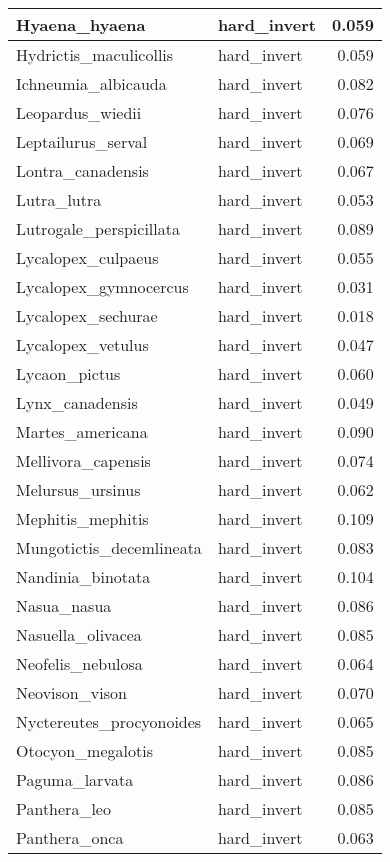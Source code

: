 \begin{table}
\begin{tabular}[t]{l|l|r}
\hline
Hyaena\_hyaena & hard\_invert & 0.059\\
\hline
Hydrictis\_maculicollis & hard\_invert & 0.059\\
\hline
Ichneumia\_albicauda & hard\_invert & 0.082\\
\hline
Leopardus\_wiedii & hard\_invert & 0.076\\
\hline
Leptailurus\_serval & hard\_invert & 0.069\\
\hline
Lontra\_canadensis & hard\_invert & 0.067\\
\hline
Lutra\_lutra & hard\_invert & 0.053\\
\hline
Lutrogale\_perspicillata & hard\_invert & 0.089\\
\hline
Lycalopex\_culpaeus & hard\_invert & 0.055\\
\hline
Lycalopex\_gymnocercus & hard\_invert & 0.031\\
\hline
Lycalopex\_sechurae & hard\_invert & 0.018\\
\hline
Lycalopex\_vetulus & hard\_invert & 0.047\\
\hline
Lycaon\_pictus & hard\_invert & 0.060\\
\hline
Lynx\_canadensis & hard\_invert & 0.049\\
\hline
Martes\_americana & hard\_invert & 0.090\\
\hline
Mellivora\_capensis & hard\_invert & 0.074\\
\hline
Melursus\_ursinus & hard\_invert & 0.062\\
\hline
Mephitis\_mephitis & hard\_invert & 0.109\\
\hline
Mungotictis\_decemlineata & hard\_invert & 0.083\\
\hline
Nandinia\_binotata & hard\_invert & 0.104\\
\hline
Nasua\_nasua & hard\_invert & 0.086\\
\hline
Nasuella\_olivacea & hard\_invert & 0.085\\
\hline
Neofelis\_nebulosa & hard\_invert & 0.064\\
\hline
Neovison\_vison & hard\_invert & 0.070\\
\hline
Nyctereutes\_procyonoides & hard\_invert & 0.065\\
\hline
Otocyon\_megalotis & hard\_invert & 0.085\\
\hline
Paguma\_larvata & hard\_invert & 0.086\\
\hline
Panthera\_leo & hard\_invert & 0.085\\
\hline
Panthera\_onca & hard\_invert & 0.063\\

\end{tabular}
\end{table}
